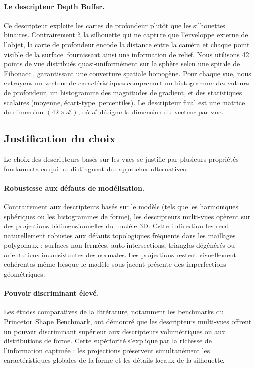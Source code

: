 \documentclass[11pt,a4paper,oneside]{report}
\begin{document}
\paragraph{Le descripteur Depth Buffer.} Ce descripteur exploite les cartes de profondeur plutôt que les silhouettes binaires. Contrairement à la silhouette qui ne capture que l'enveloppe externe de l'objet, la carte de profondeur encode la distance entre la caméra et chaque point visible de la surface, fournissant ainsi une information de relief. Nous utilisons 42 points de vue distribués quasi-uniformément sur la sphère selon une spirale de Fibonacci, garantissant une couverture spatiale homogène. Pour chaque vue, nous extrayons un vecteur de caractéristiques comprenant un histogramme des valeurs de profondeur, un histogramme des magnitudes de gradient, et des statistiques scalaires (moyenne, écart-type, percentiles). Le descripteur final est une matrice de dimension $(42 \times d')$, où $d'$ désigne la dimension du vecteur par vue.

\subsection{Justification du choix}

Le choix des descripteurs basés sur les vues se justifie par plusieurs propriétés fondamentales qui les distinguent des approches alternatives.

\paragraph{Robustesse aux défauts de modélisation.} Contrairement aux descripteurs basés sur le modèle (tels que les harmoniques sphériques ou les histogrammes de forme), les descripteurs multi-vues opèrent sur des projections bidimensionnelles du modèle 3D. Cette indirection les rend naturellement robustes aux défauts topologiques fréquents dans les maillages polygonaux : surfaces non fermées, auto-intersections, triangles dégénérés ou orientations inconsistantes des normales. Les projections restent visuellement cohérentes même lorsque le modèle sous-jacent présente des imperfections géométriques.

\paragraph{Pouvoir discriminant élevé.} Les études comparatives de la littérature, notamment les benchmarks du Princeton Shape Benchmark, ont démontré que les descripteurs multi-vues offrent un pouvoir discriminant supérieur aux descripteurs volumétriques ou aux distributions de forme. Cette supériorité s'explique par la richesse de l'information capturée : les projections préservent simultanément les caractéristiques globales de la forme et les détails locaux de la silhouette.
\end{document}
